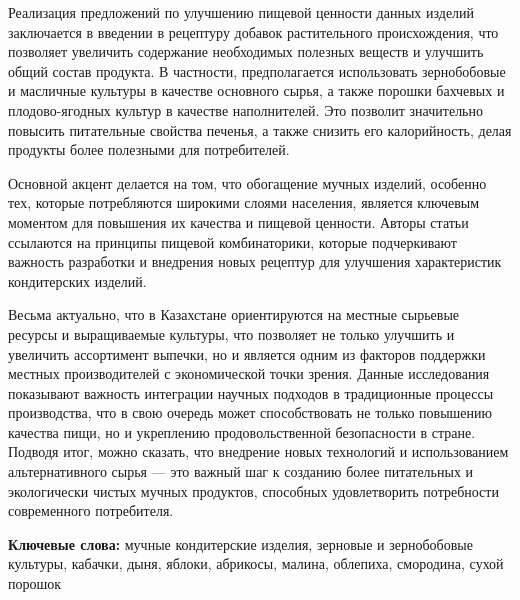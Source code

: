 Реализация предложений по улучшению пищевой ценности данных изделий
заключается в введении в рецептуру добавок растительного происхождения,
что позволяет увеличить содержание необходимых полезных веществ и
улучшить общий состав продукта. В частности, предполагается использовать
зернобобовые и масличные культуры в качестве основного сырья, а также
порошки бахчевых и плодово-ягодных культур в качестве наполнителей. Это
позволит значительно повысить питательные свойства печенья, а также
снизить его калорийность, делая продукты более полезными для
потребителей.

Основной акцент делается на том, что обогащение мучных изделий, особенно
тех, которые потребляются широкими слоями населения, является ключевым
моментом для повышения их качества и пищевой ценности. Авторы статьи
ссылаются на принципы пищевой комбинаторики, которые подчеркивают
важность разработки и внедрения новых рецептур для улучшения
характеристик кондитерских изделий.

Весьма актуально, что в Казахстане ориентируются на местные сырьевые
ресурсы и выращиваемые культуры, что позволяет не только улучшить и
увеличить ассортимент выпечки, но и является одним из факторов поддержки
местных производителей с экономической точки зрения. Данные исследования
показывают важность интеграции научных подходов в традиционные процессы
производства, что в свою очередь может способствовать не только
повышению качества пищи, но и укреплению продовольственной безопасности
в стране. Подводя итог, можно сказать, что внедрение новых технологий и
использованием альтернативного сырья --- это важный шаг к созданию более
питательных и экологически чистых мучных продуктов, способных
удовлетворить потребности современного потребителя.

{\bfseries Ключевые слова:} мучные кондитерские изделия, зерновые и
зернобобовые культуры, кабачки, дыня, яблоки, абрикосы, малина,
облепиха, смородина, сухой порошок

